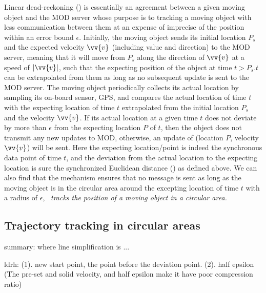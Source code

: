 Linear dead-reckoning (\ldr) is essentially an agreement between a given moving object and the MOD server whose purpose is to tracking a moving object with less communication between them at an expense of imprecise of the position within an error bound $\epsilon$.  
%
Initially, the moving object sends its initial location $P_s$ and the expected velocity $\vv{v}$
(including value and direction) to the MOD server, meaning that it will move from $P_s$ along the direction of $\vv{v}$ at a speed of $|\vv{v}|$, such that the expecting position of the object at time $t>P_s.t$ can be extrapolated from them as long as no subsequent update is sent to the MOD server.
%
The moving object periodically collects its actual location by sampling its on-board sensor, \eg GPS, and compares the actual location of time $t$ with the expecting location of time $t$ extrapolated from the initial location $P_s$ and the velocity $\vv{v}$. If its actual location at a given time $t$ does not deviate by more than $\epsilon$ from the expecting location $P$ of $t$, then the object does not transmit any new updates to MOD, otherwise, an update of (location $P$, velocity $\vv{v}$) will be sent.
%
Here the expecting location/point is indeed the synchronous data point \wrt of time $t$, and the deviation from the actual location to the expecting location is sure the synchronized Euclidean distance (\sed) as defined above. We can also find that the \ldr mechanism ensures that no message is sent as long as the moving object is in the circular area around the excepting location of time $t$ with a radius of $\epsilon$, \ie~\emph{\ldr tracks the position of a moving object in a circular area.}


\subsection{Trajectory tracking in circular areas}
summary: 
where line simplification is ...

ldrh: (1). new start point, the point before the deviation point. (2). half epsilon
(The pre-set and solid velocity, and half epsilon make it have poor compression ratio)





